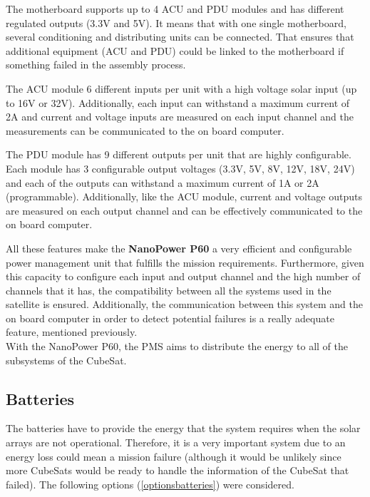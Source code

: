 The motherboard supports up to 4 ACU and PDU modules and has different regulated outputs (3.3V and 5V). It means that with one single motherboard, several conditioning and distributing units can be connected. That ensures that additional equipment (ACU and PDU) could be linked to the motherboard if something failed in the assembly process.

The ACU module 6 different inputs per unit with a high voltage solar input (up to 16V or 32V). Additionally, each input can withstand a maximum current of 2A and current and voltage inputs are measured on each input channel and the measurements can be communicated to the on board computer.

The PDU module has 9 different outputs per unit that are highly configurable. Each module has 3 configurable output voltages (3.3V, 5V, 8V, 12V, 18V, 24V) and each of the outputs can withstand a maximum current of 1A or 2A (programmable). Additionally, like the ACU module, current and voltage outputs are measured on each output channel and can be effectively communicated to the on board computer.

All these features make the \textbf{NanoPower P60} a very efficient and configurable power management unit that fulfills the mission requirements. Furthermore, given this capacity to configure each input and output channel and the high number of channels that it has, the compatibility between all the systems used in the satellite is ensured. Additionally, the communication between this system and the on board computer in order to detect potential failures is a really adequate feature, mentioned previously.\\
With the NanoPower P60, the PMS aims to distribute the energy to all of the subsystems of the CubeSat.

\subsection{Batteries}

The batteries have to provide the energy that the system requires when the solar arrays are not operational. Therefore, it is a very important system due to an energy loss could mean a mission failure (although it would be unlikely since more CubeSats would be ready to handle the information of the CubeSat that failed). The following options (\ref{optionsbatteries}) were considered.

